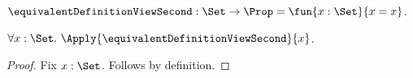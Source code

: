 

\begin{definition}\label{equivalent_definition_view_second}
    $\equivalentDefinitionViewSecond:\Set\to\Prop
        =\fun{x:\Set}{x=x}$.
\end{definition}

\begin{proposition}\label{equivalent_definition_view_usable}
    $\forall x:\Set.\ \Apply{\equivalentDefinitionViewSecond}{x}$.
\end{proposition}
\begin{proof}
    Fix $x:\Set$.
    Follows by definition.
\end{proof}
